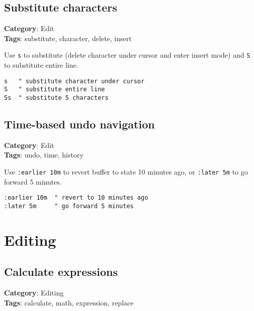 {{{{\section{Substitute characters}

\textbf{Category}: Edit\\ \textbf{Tags}: substitute, character, delete, insert
\vspace{0.5cm}

Use {\footnotesize \Verb§s§} to substitute (delete character under cursor and enter insert mode) and {\footnotesize \Verb§S§} to substitute entire line.

\begin{Exa*}{}
\begin{Verbatim}[fontsize=\footnotesize, breaklines, breakanywhere]
s   " substitute character under cursor
S   " substitute entire line
5s  " substitute 5 characters
\end{Verbatim}
\end{Exa*}

\section{Time-based undo navigation}

\textbf{Category}: Edit\\ \textbf{Tags}: undo, time, history
\vspace{0.5cm}

Use {\footnotesize \Verb§:earlier 10m§} to revert buffer to state 10 minutes ago, or {\footnotesize \Verb§:later 5m§} to go forward 5 minutes.

\begin{Exa*}{}
\begin{Verbatim}[fontsize=\footnotesize, breaklines, breakanywhere]
:earlier 10m  " revert to 10 minutes ago
:later 5m     " go forward 5 minutes
\end{Verbatim}
\end{Exa*}

\chapter{Editing}
\section{Calculate expressions}

\textbf{Category}: Editing\\ \textbf{Tags}: calculate, math, expression, replace
\vspace{0.5cm}

}}}}
